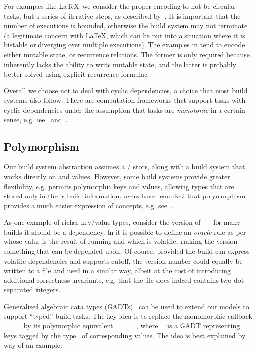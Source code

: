 For examples like \LaTeX~we consider the proper encoding to not be circular
tasks, but a series of iterative steps, as described
by~\cite{shake-fixed-point}. It is important that the number of executions is
bounded, otherwise the build system may not terminate (a legitimate concern
with \LaTeX, which can be put into a situation where it is bistable or diverging
over multiple executions). The examples in \Excel tend to encode either mutable
state, or recurrence relations. The former is only required because \Excel
inherently lacks the ability to write mutable state, and the latter is probably
better solved using explicit recurrence formulae.

Overall we choose not to deal with cyclic dependencies, a choice that most build
systems also follow. There are computation frameworks that support tasks with
cyclic dependencies under the assumption that tasks are \emph{monotonic} in a
certain sense, e.g. see~\cite{pottier2009lazy} and~\cite{radul2009propagation}.

\subsection{Polymorphism}\label{sec-polymorphism}

Our build system abstraction assumes a / store, along with a build
system that works directly on  and  values. However, some build
systems provide greater flexibility, e.g. \Shake permits polymorphic keys and
values, allowing types that are stored only in the \Shake's build information.
\Shake users have remarked that polymorphism provides a much easier expression
of concepts, e.g. see~\cite{hadrian}.

As one example of richer key/value types, consider the version of
~--~for many builds it should be a dependency. In \Shake it is possible
to define an \emph{oracle} rule as per~\cite{mitchell2012shake} whose value is
the result of running  and which is volatile, making the
 version something that can be depended upon. Of course, provided the
build can express volatile dependencies and supports cutoff, the version number
could equally be written to a file and used in a similar way, albeit at the cost
of introducing additional correctness invariants, e.g. that the file
 does indeed contains two dot-separated integers.

Generalised algebraic data types (GADTs)~\cite{spj2006gadts} can be used to
extend our models to support ``typed'' build tasks. The key idea is to replace
the monomorphic callback ~\hs{::}~~\hs{->}~~ by its
polymorphic equivalent ~\hs{::}~~~\hs{->}~~,
where~~ is a GADT representing keys tagged by the type~ of
corresponding values. The idea is best explained by way of an example:

